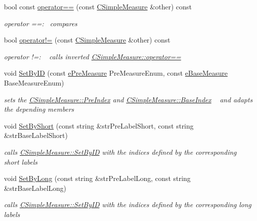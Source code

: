 \begin{DoxyCompactItemize}
bool const \hyperlink{classCSimpleMeasure_aafe9d3871eadf4004a62a8561b883b1e}{operator==} (const \hyperlink{classCSimpleMeasure}{C\+Simple\+Measure} \&other) const
\begin{DoxyCompactList}\small\item\em operator ==\+:~\newline
 compares \end{DoxyCompactList}\item 
bool \hyperlink{classCSimpleMeasure_a157b4e0af2843d8fb5c369b92cfd7c1f}{operator!=} (const \hyperlink{classCSimpleMeasure}{C\+Simple\+Measure} \&other) const
\begin{DoxyCompactList}\small\item\em operator !=\+: ~\newline
 calls inverted \hyperlink{classCSimpleMeasure_aafe9d3871eadf4004a62a8561b883b1e}{C\+Simple\+Measure\+::operator==} \end{DoxyCompactList}\item 
void \hyperlink{classCSimpleMeasure_a6945aa333dca5623482d38cd9a7e3225}{Set\+By\+ID} (const \hyperlink{PreMeasure_8h_a6c81167b8d4c2badde42f81cb7214620}{e\+Pre\+Measure} Pre\+Measure\+Enum, const \hyperlink{BaseMeasure_8h_ac90e5164ccf1f0d648fba7e94b229a11}{e\+Base\+Measure} Base\+Measure\+Enum)
\begin{DoxyCompactList}\small\item\em sets the \hyperlink{classCSimpleMeasure_aa23ed9eec21adb9a97c90a424e7ee18a}{C\+Simple\+Measure\+::\+Pre\+Index} and \hyperlink{classCSimpleMeasure_a191dbfa4cc374946bf8a82111f827d92}{C\+Simple\+Measure\+::\+Base\+Index} ~\newline
 and adapts the depending members \end{DoxyCompactList}\item 
void \hyperlink{classCSimpleMeasure_a36d8822c057c58669d23af68f24a75c5}{Set\+By\+Short} (const string \&str\+Pre\+Label\+Short, const string \&str\+Base\+Label\+Short)
\begin{DoxyCompactList}\small\item\em calls \hyperlink{classCSimpleMeasure_a6945aa333dca5623482d38cd9a7e3225}{C\+Simple\+Measure\+::\+Set\+By\+ID} with the indices defined by the corresponding short labels \end{DoxyCompactList}\item 
void \hyperlink{classCSimpleMeasure_acebe5fcf7a5aa3464d9274f14c9f312b}{Set\+By\+Long} (const string \&str\+Pre\+Label\+Long, const string \&str\+Base\+Label\+Long)
\begin{DoxyCompactList}\small\item\em calls \hyperlink{classCSimpleMeasure_a6945aa333dca5623482d38cd9a7e3225}{C\+Simple\+Measure\+::\+Set\+By\+ID} with the indices defined by the corresponding long labels \end{DoxyCompactList}\item 

\end{DoxyCompactItemize}
